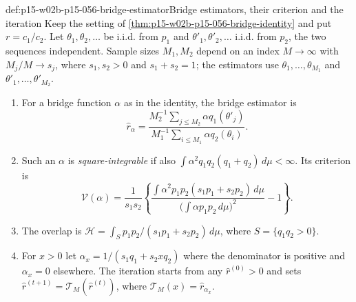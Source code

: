\begin{hbdefinition}{def:p15-w02b-p15-056-bridge-estimator}{Bridge estimators, their criterion and the iteration}
Keep the setting of \cref{thm:p15-w02b-p15-056-bridge-identity} and put
\(r=c_1/c_2\). Let \(\theta_1,\theta_2,\ldots\) be i.i.d. from \(p_1\)
and \(\theta'_1,\theta'_2,\ldots\) i.i.d. from \(p_2\), the two sequences
independent. Sample sizes \(M_1,M_2\) depend on an index \(M\to\infty\)
with \(M_j/M\to s_j\), where \(s_1,s_2>0\) and \(s_1+s_2=1\); the estimators
use \(\theta_1,\ldots,\theta_{M_1}\) and \(\theta'_1,\ldots,\theta'_{M_2}\).
\begin{enumerate}
\item For a bridge function \(\alpha\) as in the identity, the bridge
estimator is
\[
 \widehat r_\alpha=\frac{M_2^{-1}\sum_{j\leq M_2}\alpha q_1(\theta'_j)}
                         {M_1^{-1}\sum_{i\leq M_1}\alpha q_2(\theta_i)} .
\]
\item Such an \(\alpha\) is \emph{square-integrable} if also
\(\int\alpha^2q_1q_2(q_1+q_2)\,d\mu<\infty\). Its criterion is
\[
 \mathcal V(\alpha)=\frac1{s_1s_2}\left\{
 \frac{\int\alpha^2p_1p_2(s_1p_1+s_2p_2)\,d\mu}
      {\bigl(\int\alpha p_1p_2\,d\mu\bigr)^2}-1\right\}.
\]
\item The overlap is
\(\mathcal H=\int_Sp_1p_2/(s_1p_1+s_2p_2)\,d\mu\), where
\(S=\{q_1q_2>0\}\).
\item For \(x>0\) let \(\alpha_x=1/(s_1q_1+s_2xq_2)\) where the
denominator is positive and \(\alpha_x=0\) elsewhere. The iteration
starts from any \(\widehat r^{(0)}>0\) and sets
\(\widehat r^{(t+1)}=\mathcal T_M(\widehat r^{(t)})\), where
\(\mathcal T_M(x)=\widehat r_{\alpha_x}\).
\end{enumerate}
\end{hbdefinition}

